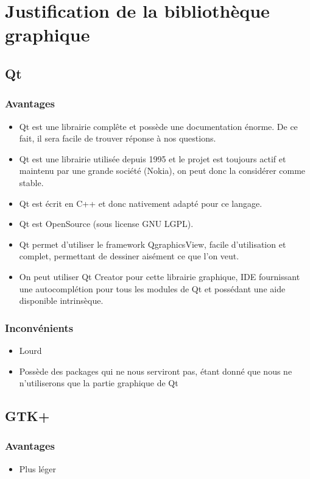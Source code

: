 \documentclass[a4paper]{report}
\begin{document}
\chapter{Justification de la bibliothèque graphique}
\section{Qt}
\subsection{Avantages}
\begin{itemize}
    \item Qt est une librairie complête et possède une documentation énorme. De ce fait, il sera facile de trouver réponse à nos questions.
    \item Qt est une librairie utilisée depuis 1995 et le projet est toujours actif et maintenu par une grande société (Nokia), on peut donc la considérer comme stable.
    \item Qt est écrit en C++ et donc nativement adapté pour ce langage.
    \item Qt est OpenSource (sous license GNU LGPL).
    \item Qt permet d'utiliser le framework QgraphicsView, facile d'utilisation et complet, permettant de dessiner aisément ce que l'on veut.
    \item On peut utiliser Qt Creator pour cette librairie graphique, IDE fournissant une autocomplétion pour tous les modules de Qt et possédant une aide disponible intrinsèque.
\end{itemize}
\subsection{Inconvénients}
\begin{itemize}
    \item Lourd
    \item Possède des packages qui ne nous serviront pas, étant donné que nous ne n'utiliserons que la partie graphique de Qt
\end{itemize}
\section{GTK+}
\subsection{Avantages}
\begin{itemize}
    \item Plus léger
\end{itemize}
\end{document}
